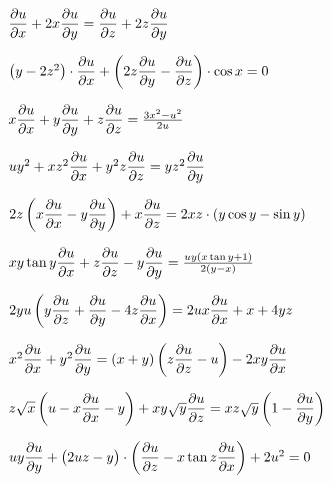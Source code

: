 	\begin{enumtasks}

		\label{nonlinsys_quazilinear:dim3}
		\item \( \dpart{u}{x} + 2 x \dpart{u}{y} = \dpart{u}{z} + 2 z \dpart{u}{y} \)													%
		\item \( \pares{y - 2z^2} \cdot \dpart{u}{x} + \pares{2z \dpart{u}{y} - \dpart{u}{z}} \cdot \cos{x} = 0 \)						%
		\item \( x \dpart{u}{x} + y \dpart{u}{y} + z \dpart{u}{z} = \frac{3 x^2 - u^2}{2u} \) 											%
		\item \( u y^2 + x z^2 \dpart{u}{x} + y^2 z \dpart{u}{z} = y z^2 \dpart{u}{y} \) 												%
		\item \( 2z \pares{ x \dpart{u}{x} - y \dpart{u}{y} } + x \dpart{u}{z} = 2xz \cdot \pares{y \cos{y} - \sin{y}} \)				%
		\item \( xy \tan{y} \dpart{u}{x} + z \dpart{u}{z} - y \dpart{u}{y} = \frac{uy \pares{x\tan{y} + 1}}{2 \pares{y - x}} \) 		%
		\item \( 2yu \pares{y \dpart{u}{z} + \dpart{u}{y} - 4z \dpart{u}{x}} = 2ux \dpart{u}{x} + x + 4yz \)							%
		\item \( x^2 \dpart{u}{x} + y^2 \dpart{u}{y} = \pares{x + y} \pares{z \dpart{u}{z} - u} - 2xy \dpart{u}{x} \) 					%
		\item \( z \sqrt{x} \pares{u - x \dpart{u}{x} - y} + xy \sqrt{y} \dpart{u}{z} = x z \sqrt{y} \pares{1 - \dpart{u}{y}} \) 		%
		\item \( uy \dpart{u}{y} + \bpares{2uz - y} \cdot \pares{\dpart{u}{z} - x \tan{z} \dpart{u}{x}} + 2u^2 = 0 \)					%
		

\end{enumtasks}

